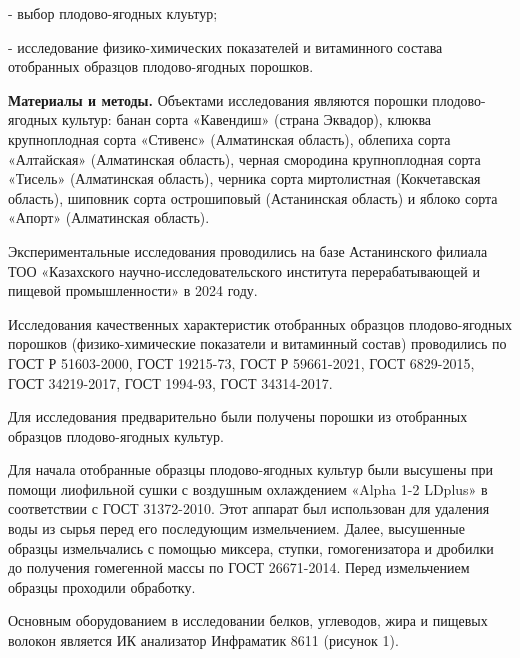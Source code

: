 \begin{multicols}{2}
- выбор плодово-ягодных клуьтур;

- исследование физико-химических показателей и витаминного состава
отобранных образцов плодово-ягодных порошков.

{\bfseries Материалы и методы.} Объектами исследования являются порошки
плодово-ягодных культур: банан сорта «Кавендиш» (страна Эквадор), клюква
крупноплодная сорта «Стивенс» (Алматинская область), облепиха сорта
«Алтайская» (Алматинская область), черная смородина крупноплодная сорта
«Тисель» (Алматинская область), черника сорта миртолистная (Кокчетавская
область), шиповник сорта острошиповый (Астанинская область) и яблоко
сорта «Апорт» (Алматинская область).

Экспериментальные исследования проводились на базе Астанинского филиала
ТОО «Казахского научно-исследовательского института перерабатывающей и
пищевой промышленности» в 2024 году.

Исследования качественных характеристик отобранных образцов
плодово-ягодных порошков (физико-химические показатели и витаминный
состав) проводились по ГОСТ Р 51603-2000, ГОСТ 19215-73, ГОСТ Р
59661-2021, ГОСТ 6829-2015, ГОСТ 34219-2017, ГОСТ 1994-93, ГОСТ
34314-2017.

Для исследования предварительно были получены порошки из отобранных
образцов плодово-ягодных культур.

Для начала отобранные образцы плодово-ягодных культур были высушены при
помощи лиофильной сушки с воздушным охлаждением «Alpha 1-2 LDplus» в
соответствии с ГОСТ 31372-2010. Этот аппарат был использован для
удаления воды из сырья перед его последующим измельчением. Далее,
высушенные образцы измельчались с помощью миксера, ступки,
гомогенизатора и дробилки до получения гомегенной массы по ГОСТ
26671-2014. Перед измельчением образцы проходили обработку.

Основным оборудованием в исследовании белков, углеводов, жира и пищевых
волокон является ИК анализатор Инфраматик 8611 (рисунок 1).
\end{multicols}

